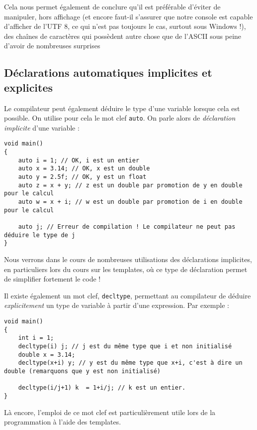 Cela nous permet également de conclure qu'il est préférable d'éviter de manipuler, hors affichage (et encore faut-il s'assurer que notre console est capable d'afficher de l'UTF 8, ce qui n'est pas toujours le cas, surtout sous Windows !), des chaînes de caractères qui possèdent autre chose que de l'ASCII sous peine d'avoir de nombreuses surprises

\subsection{Déclarations automatiques implicites et explicites}



Le compilateur peut également déduire le type d'une variable lorsque cela est possible. On utilise pour cela le mot clef
\texttt{auto}. On parle alors de \textsl{déclaration implicite} d'une variable :

\begin{lstlisting}[caption=Exemple d'utilisation d'une déclaration implicite]
void main()
{
    auto i = 1; // OK, i est un entier
    auto x = 3.14; // OK, x est un double
    auto y = 2.5f; // OK, y est un float
    auto z = x + y; // z est un double par promotion de y en double pour le calcul
    auto w = x + i; // w est un double par promotion de i en double pour le calcul

    auto j; // Erreur de compilation ! Le compilateur ne peut pas déduire le type de j
}
\end{lstlisting}

Nous verrons dans le cours de nombreuses utilisations des déclarations implicites, en particuliers lors du cours sur les templates, où ce type de déclaration permet de simplifier fortement le code !

Il existe également un mot clef, \texttt{decltype}, permettant au compilateur de déduire \textsl{explicitement} un type de variable à partir d'une expression. Par exemple :

\begin{lstlisting}[caption=déduction explicite de type]
void main()
{
    int i = 1;
    decltype(i) j; // j est du même type que i et non initialisé
    double x = 3.14;
    decltype(x+i) y; // y est du même type que x+i, c'est à dire un double (remarquons que y est non initialisé)

    decltype(i/j+1) k  = 1+i/j; // k est un entier.
}
\end{lstlisting}

Là encore, l'emploi de ce mot clef est particulièrement utile lors de la programmation à l'aide des templates.

